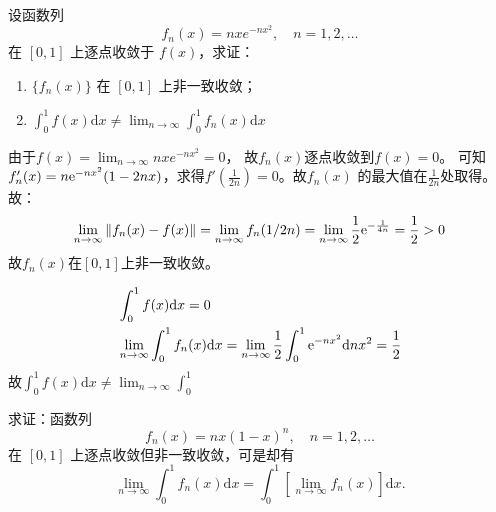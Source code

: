 \begin{problem}
    设函数列\[
        f_n(x) = nx e^{-nx^2} , \quad n = 1, 2, \dots
    \]
    在 \([0, 1]\) 上逐点收敛于 \(f(x)\)，求证：
    \begin{enumerate}
        \item \(\{f_n(x)\}\) 在 \([0, 1]\) 上非一致收敛；
        \item \(\int_{0}^{1} f(x) \mathrm{d}x \neq \lim_{n \to \infty}
            \int_{0}^{1} f_n(x) \mathrm{d}x\)
    \end{enumerate}
\end{problem}

\begin{solution}
    由于\(f(x) = \lim_{n \to \infty} nx e^{-nx^2} = 0\)，
    故\(f_{n}(x)\)逐点收敛到\(f(x) = 0\)。
    可知\(f_{n}'(x) = n \mathrm{e}^{-nx^{2}}(1-2nx)\)，求得\(f'\left(
    \frac{1}{2n} \right) = 0\)。故\(f_{n}(x)\)
    的最大值在\(\frac{1}{2n}\)处取得。
    故：
    \[
        \lim_{n \to \infty} \left\lVert f_{n}(x) - f(x) \right\rVert
        = \lim_{n \to \infty} f_{n}(1/2n) = \lim_{n \to \infty}
        \frac{1}{2} \mathrm{e}^{-\frac{1}{4n}} = \frac{1}{2} >  0
    \]
    故\(f_{n}(x)\)在\([0,1]\)上非一致收敛。

    \begin{align*}
        & \int_{0}^{1} f(x) \mathrm{d}x = 0                       \\
        & \lim_{n \to \infty} \int_{0}^{1} f_{n}(x) \mathrm{d}x =
        \lim_{n \to \infty} \frac{1}{2}\int_{0}^{1}
        \mathrm{e}^{-nx^{2}} \mathrm{d}nx^{2} = \frac{1}{2}
    \end{align*}
    故\(\int_{0}^{1} f(x) \mathrm{d}x \neq \lim_{n \to
    \infty} \int_{0}^{1}\)

\end{solution}

\begin{problem}
    求证：函数列
    \[
        f_n(x) = nx(1-x)^n, \quad n = 1, 2, \dots
    \]
    在 \([0, 1]\) 上逐点收敛但非一致收敛，可是却有
    \[
        \lim_{n \to \infty} \int_0^1 f_n(x) \mathrm{d}x =
        \int_0^1 \left[
        \lim_{n \to \infty} f_n(x) \right] \mathrm{d}x.
    \]
\end{problem}

